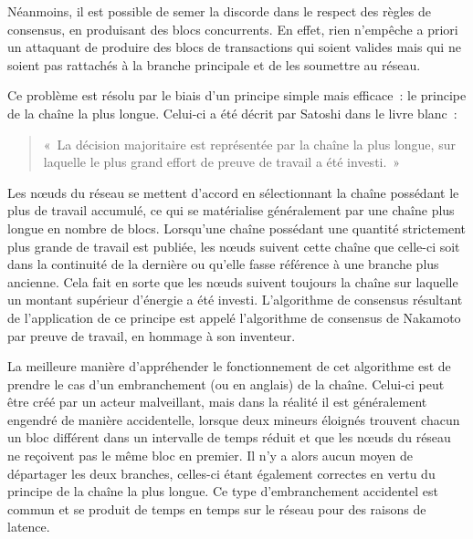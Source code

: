 Néanmoins, il est possible de semer la discorde dans le respect des règles de consensus, en produisant des blocs concurrents. En effet, rien n'empêche a priori un attaquant de produire des blocs de transactions qui soient valides mais qui ne soient pas rattachés à la branche principale et de les soumettre au réseau.


Ce problème est résolu par le biais d'un principe simple mais efficace~: le principe de la chaîne la plus longue. Celui-ci a été décrit par Satoshi dans le livre blanc~: 

\begin{quote}
«~La décision majoritaire est représentée par la chaîne la plus longue, sur laquelle le plus grand effort de preuve de travail a été investi.~»
\end{quote}

Les nœuds du réseau se mettent d'accord en sélectionnant la chaîne possédant le plus de travail accumulé, ce qui se matérialise généralement par une chaîne plus longue en nombre de blocs. Lorsqu'une chaîne possédant une quantité strictement plus grande de travail est publiée, les nœuds suivent cette chaîne que celle-ci soit dans la continuité de la dernière ou qu'elle fasse référence à une branche plus ancienne. Cela fait en sorte que les nœuds suivent toujours la chaîne sur laquelle un montant supérieur d'énergie a été investi. L'algorithme de consensus résultant de l'application de ce principe est appelé l'algorithme de consensus de Nakamoto par preuve de travail, en hommage à son inventeur.


La meilleure manière d'appréhender le fonctionnement de cet algorithme est de prendre le cas d'un embranchement (ou  en anglais) de la chaîne. Celui-ci peut être créé par un acteur malveillant, mais dans la réalité il est généralement engendré de manière accidentelle, lorsque deux mineurs éloignés trouvent chacun un bloc différent dans un intervalle de temps réduit et que les nœuds du réseau ne reçoivent pas le même bloc en premier. Il n'y a alors aucun moyen de départager les deux branches, celles-ci étant également correctes en vertu du principe de la chaîne la plus longue. Ce type d'embranchement accidentel est commun et se produit de temps en temps sur le réseau pour des raisons de latence.

